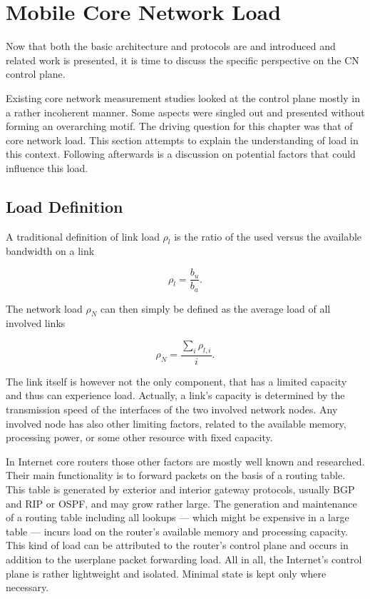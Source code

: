 \section{Mobile Core Network Load}
\label{c4:sec:loaddefinition}

Now that both the basic architecture and protocols are and introduced and related work is presented, it is time to discuss the specific perspective on the \gls{CN} control plane.

Existing core network measurement studies looked at the control plane mostly in a rather incoherent manner. Some aspects were singled out and presented without forming an overarching motif. The driving question for this chapter was that of core network load. This section attempts to explain the understanding of load in this context. Following afterwards is a discussion on potential factors that could influence this load.


\subsection{Load Definition}

A traditional definition of link load $\rho_{l}$ is the ratio of the used versus the available bandwidth on a link

\begin{equation}
\rho_{l} = \frac{b_{u}}{b_{a}}\text{.}
\end{equation}

The network load $\rho_{N}$ can then simply be defined as the average load of all involved links

\begin{equation}
\rho_{N} = \frac{\sum_{i} \rho_{l,i}}{i}\text{.}
\end{equation}

The link itself is however not the only component, that has a limited capacity and thus can experience load. Actually, a link's capacity is determined by the transmission speed of the interfaces of the two involved network nodes. Any involved node has also other limiting factors, related to the available memory, processing power, or some other resource with fixed capacity.

In Internet core routers those other factors are mostly well known and researched. Their main functionality is to forward packets on the basis of a routing table. This table is generated by exterior and interior gateway protocols, usually \gls{BGP} and \gls{RIP} or \gls{OSPF}, and may grow rather large. The generation and maintenance of a routing table including all lookups --- which might be expensive in a large table --- incurs load on the router's available memory and processing capacity. This kind of load can be attributed to the router's control plane and occurs in addition to the userplane packet forwarding load. All in all, the Internet's control plane is rather lightweight and isolated. Minimal state is kept only where necessary.

